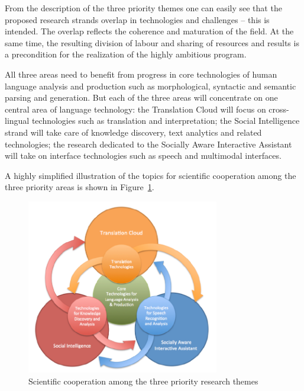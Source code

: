 \documentclass[10pt, plain]{../../metanetpaper}
\begin{document}
\begin{multicols}{2}

From the description of the three priority themes one can easily see that the proposed research strands overlap in technologies and challenges -- this is intended. The overlap reflects the coherence and maturation of the field. At the same time, the resulting division of labour and sharing of resources and results is a precondition for the realization of the highly ambitious program.
 
All three areas need to benefit from progress in core technologies of human language analysis and production such as morphological, syntactic and semantic parsing and generation. But each of the three areas will concentrate on one central area of language technology: the Translation Cloud will focus on cross-lingual technologies such as translation and interpretation; the Social Intelligence strand will take care of knowledge discovery, text analytics and related technologies; the research dedicated to the Socially Aware Interactive Assistant will take on interface technologies such as speech and multimodal interfaces.
 
A highly simplified illustration of the topics for scientific cooperation among the three priority areas is shown in Figure~\ref{fig:priority-themes}.

\begin{figure}[htb]
  \center
  \includegraphics[width=0.75\textwidth]{../_media/PT-Rings}
  \caption{Scientific cooperation among the three priority research themes}
  \label{fig:priority-themes}
\end{figure}


\end{multicols}
\end{document}
